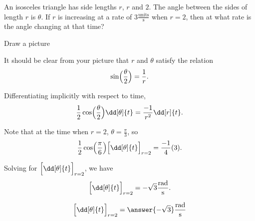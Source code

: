 \documentclass{ximera}
\author{Steven Gubkin\and Nela Lakos}
\begin{document}
\begin{exercise}

An isosceles triangle has side lengths $r$, $r$ and $2$.  The angle
between the sides of length $r$ is $\theta$.  If $r$ is increasing at
a rate of $3 \frac{\textrm{units}}{\textrm{s}}$ when $r = 2$, then at
what rate is the angle changing at that time?

\begin{hint}
  Draw a picture
\end{hint}

\begin{hint}
  It should be clear from your picture that $r$ and $\theta$ satisfy the relation 
  \[
  \sin\Bigl(\frac{\theta}{2}\Bigr) = \frac{1}{r}.
  \]
\end{hint}

\begin{hint}
  Differentiating implicitly with respect to time, 
  \[
  \frac{1}{2}\cos\Bigl(\frac{\theta}{2}\Bigr) \dd[\theta]{t} = \frac{-1}{r^2}
  \dd[r]{t}.
  \]
\end{hint}

\begin{hint}
  Note that at the time when $r = 2$, $\theta = \frac{\pi}{3}$, so
  \[
  \frac{1}{2} \cos\Bigl(\frac{\pi}{6}\Bigr)\Bigl[ \dd[\theta]{t}\Bigr]_{r=2} = \frac{-1}{4} (3).
  \]
\end{hint}

\begin{hint}
  Solving for $\Bigl[ \dd[\theta]{t}\Bigr]_{r=2} $, we have
  \[
\Bigl[ \dd[\theta]{t}\Bigr]_{r=2}  = -\sqrt{3}\frac{\textrm{rad}}{\textrm{s}}.
  \]
\end{hint}

\begin{prompt}
  \[
\Bigl[ \dd[\theta]{t}\Bigr]_{r=2}  = \answer{-\sqrt{3}}\frac{\textrm{rad}}{\textrm{s}}
  \]
\end{prompt}
\end{exercise}
\end{document}
